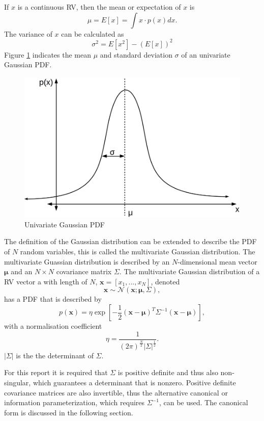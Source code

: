 \documentclass[12pt,oneside,openany,a4paper, %
afrikaans,english,
]{memoir}
\numberwithin{equation}{chapter}
\begin{document}
If $x$ is a continuous RV, then the mean or expectation of $x$ is
\begin{equation}
\mu = E\left[ x \right] = \int x \cdot p(x)dx.
\end{equation}
The variance of $x$ can be calculated as
\begin{equation}
\sigma^2 = E[x^2] - (E[x])^2
\end{equation}
 Figure \ref{fig:gPDF1} indicates the mean $\mu$ and standard deviation $\sigma$ of an univariate Gaussian PDF.
\begin{figure}[H]
  \includegraphics[width=0.6\linewidth]{Figures/univariate.png}
  \centering
  \caption{Univariate Gaussian PDF}
  \label{fig:gPDF1}
\end{figure}
The definition of the Gaussian distribution can be extended to describe the PDF of $N$ random variables, this is called the multivariate Gaussian distribution. The multivariate Guassian distribution is described by an $N$-dimensional mean vector $\bm{\mu}$ and an $N\times N$ covariance matrix $\Sigma$. The multivariate Gaussian distribution of a RV vector a with length of $N$, $\bm{x} = [x_1,...,x_N]$, denoted
\begin{equation}
\bm{x} \sim \mathcal{N}(\bm{x}; \bm{\mu},\Sigma),
\end{equation}
has a PDF that is described by
\begin{equation}\label{eq:3}
p(\bm{x})  = \eta\exp\left[-\frac{1}{2}(\bm{x}-\bm{\mu})^T\Sigma^{-1}(\bm{x}-\bm{\mu})\right],
\end{equation}
with a normalisation coefficient
\begin{equation}\label{eq:4}
\eta = \frac{1}{(2\pi)^{\frac{N}{2}}|\Sigma|^{\frac{1}{2}}}.
\end{equation}
$|\Sigma|$ is the the determinant of $\Sigma$.

For this report it is required that $\Sigma$ is positive definite and thus also non-singular, which guarantees a determinant that is nonzero. Positive definite covariance matrices are also invertible, thus the alternative canonical or information parameterization, which requires $\Sigma^{-1}$, can be used. The canonical form is discussed in the following section.
\end{document}
